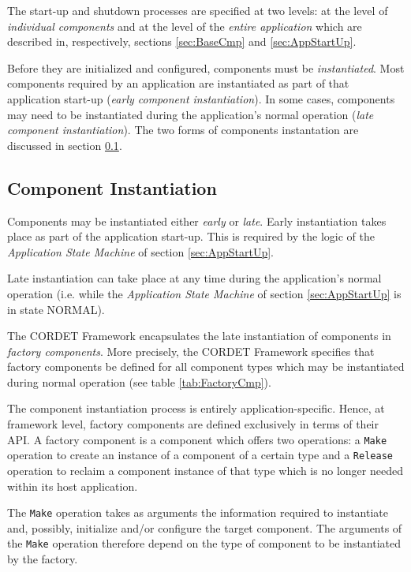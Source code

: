 \documentclass{pnp_article}
\begin{document}
The start-up and shutdown processes are specified at two levels: at the level of \textit{individual components} and at the level of the \textit{entire application} which are described in, respectively, sections \ref{sec:BaseCmp} and \ref{sec:AppStartUp}.

Before they are initialized and configured, components must be \textit{instantiated}. Most components required by an application are instantiated as part of that application start-up (\textit{early component instantiation}). In some cases, components may need to be instantiated during the application's normal operation (\textit{late component instantiation}). The two forms of components instantation are discussed in section \ref{sec:CmpInst}.

\subsection{Component Instantiation}\label{sec:CmpInst}

Components may be instantiated either \textit{early} or \textit{late}. Early instantiation takes place as part of the application start-up. This is required by the logic of the \textit{Application State Machine} of section \ref{sec:AppStartUp}.

Late instantiation can take place at any time during the application's normal operation (i.e. while the \textit{Application State Machine} of section \ref{sec:AppStartUp} is in state NORMAL). 

The CORDET Framework encapsulates the late instantiation of components in \textit{factory components}. More precisely, the CORDET Framework specifies that factory components be defined for all component types which may be instantiated during normal operation (see table \ref{tab:FactoryCmp}).

The component instantiation process is entirely application-specific. 
Hence, at framework level, factory components are defined exclusively in terms of their API. A factory component is a component which offers two operations: a \texttt{Make} operation to create an instance of a component of a certain type and a \texttt{Release} operation to reclaim a component instance of that type which is no longer needed within its host application.

The \texttt{Make} operation takes as arguments the information required to instantiate and, possibly, initialize and/or configure the target component. The arguments of the \texttt{Make} operation therefore depend on the type of component to be instantiated by the factory.
\end{document}
